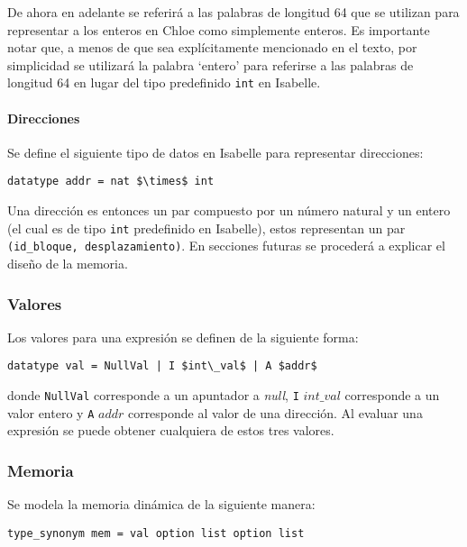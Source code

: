 De ahora en adelante se referirá a las palabras de longitud 64 que se utilizan para representar a los enteros en Chloe como simplemente enteros.
Es importante notar que, a menos de que sea explícitamente mencionado en el texto, por simplicidad se utilizará la palabra `entero' para referirse a las palabras de longitud 64 en lugar del tipo predefinido \verb|int| en Isabelle.

\paragraph*{Direcciones}

Se define el siguiente tipo de datos en Isabelle para representar direcciones:

\begin{lstlisting}[frame=single, mathescape=true]
datatype addr = nat $\times$ int
\end{lstlisting}

Una dirección es entonces un par compuesto por un número natural y un entero (el cual es de tipo \verb|int| predefinido en Isabelle), estos representan un par \verb|(id_bloque, desplazamiento)|.
En secciones futuras se procederá a explicar el diseño de la memoria.

\subsubsection*{Valores}

Los valores para una expresión se definen de la siguiente forma:

\begin{lstlisting}[frame=single, mathescape=true]
datatype val = NullVal | I $int\_val$ | A $addr$
\end{lstlisting}

donde \verb|NullVal| corresponde a un apuntador a \textit{null}, \verb|I| $int\_val$ corresponde a un valor entero y \verb|A| $addr$ corresponde al valor de una dirección.
Al evaluar una expresión se puede obtener cualquiera de estos tres valores.

\subsubsection*{Memoria}

Se modela la memoria dinámica de la siguiente manera:

\begin{lstlisting}[frame=single, mathescape=true]
type_synonym mem = val option list option list
\end{lstlisting}

